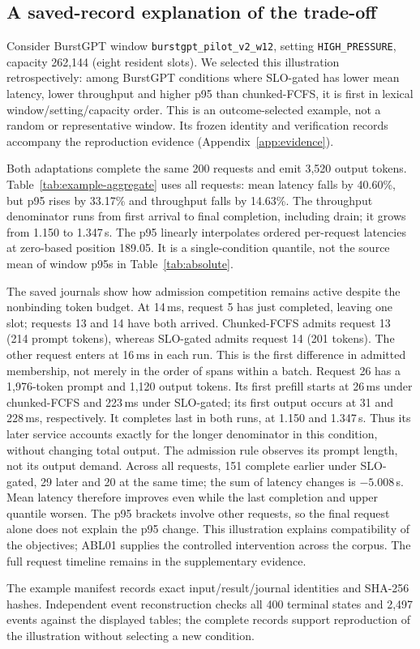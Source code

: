 \subsection{A saved-record explanation of the trade-off}\label{sec:example}
Consider BurstGPT window \texttt{burstgpt\_pilot\_v2\_w12}, setting
\texttt{HIGH\_PRESSURE}, capacity 262,144 (eight resident slots).
We selected this illustration retrospectively: among BurstGPT conditions
where SLO-gated has lower mean latency, lower throughput and higher p95 than
chunked-FCFS, it is first in lexical window/setting/capacity order. This is
an outcome-selected example, not a random or representative window.
Its frozen identity and verification records accompany the reproduction
evidence (Appendix~\ref{app:evidence}).

Both adaptations complete the same 200 requests and emit 3,520 output tokens.
Table~\ref{tab:example-aggregate} uses all requests: mean latency falls by
40.60\%, but p95 rises by 33.17\% and throughput falls by 14.63\%.
The throughput denominator runs from first arrival to final completion,
including drain; it grows from 1.150 to 1.347\,s. The p95 linearly
interpolates ordered per-request latencies at zero-based position 189.05.
It is a single-condition quantile, not the source mean of window p95s in
Table~\ref{tab:absolute}.

\begin{table}[!htbp]
\centering\small\setlength{\tabcolsep}{4pt}
\caption{One outcome-selected BurstGPT condition, with identical completed
inputs and output count. All times and rates are CM quantities. Duration
includes the drain; percentages in the text are relative to chunked-FCFS.}
\label{tab:example-aggregate}
\end{table}

The saved journals show how admission competition remains active despite
the nonbinding token budget. At 14\,ms, request 5 has just completed, leaving
one slot; requests 13 and 14 have both arrived. Chunked-FCFS admits request
13 (214 prompt tokens), whereas SLO-gated admits request 14 (201 tokens).
The other request enters at 16\,ms in each run. This is the first difference
in admitted membership, not merely in the order of spans within a batch.
Request 26 has a 1,976-token prompt and 1,120 output tokens. Its first prefill
starts at 26\,ms under chunked-FCFS and 223\,ms under SLO-gated; its first
output occurs at 31 and 228\,ms, respectively. It completes last in both
runs, at 1.150 and 1.347\,s. Thus its later service accounts exactly for
the longer denominator in this condition, without changing total output.
The admission rule observes its prompt length, not its output demand.
Across all requests, 151 complete earlier under SLO-gated, 29 later and
20 at the same time; the sum of latency changes is $-5.008$\,s. Mean latency
therefore improves even while the last completion and upper quantile worsen.
The p95 brackets involve other requests, so the final request alone does
not explain the p95 change. This illustration explains compatibility of
the objectives; ABL01 supplies the controlled intervention across the corpus.
The full request timeline remains in the supplementary evidence.

The example manifest records exact input/result/journal identities and
SHA-256 hashes. Independent event reconstruction checks all 400 terminal
states and 2,497 events against the displayed tables; the complete records
support reproduction of the illustration without selecting a new condition.
